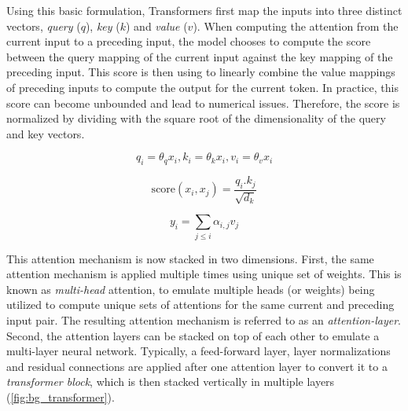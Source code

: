 \documentclass[letterpaper, 12pt]{report}
\begin{document}
Using this basic formulation, Transformers first map the inputs into three distinct vectors, \textit{query} ($q$), \textit{key} ($k$) and \textit{value} ($v$). When computing the attention from the current input to a preceding input, the model chooses to compute the score between the query mapping of the current input against the key mapping of the preceding input. This score is then using to linearly combine the value mappings of preceding inputs to compute the output for the current token. In practice, this score can become unbounded and lead to numerical issues. Therefore, the score is normalized by dividing with the square root of the dimensionality of the query and key vectors.

\begin{equation}
  q_{i} = \theta_{q}x_{i}, k_{i} = \theta_{k}x_{i}, v_{i} = \theta_{v}x_{i}
\end{equation}

\begin{equation}
  \text{score}(x_{i},x_{j}) = \frac{q_{i}.k_{j}}{\sqrt{d_{k}}}
\end{equation}

\begin{equation}
  y_{i} = \sum_{j \le i}\alpha_{i,j}v_{j}
\end{equation}

This attention mechanism is now stacked in two dimensions. First, the same attention mechanism is applied multiple times using unique set of weights. This is known as \textit{multi-head} attention, to emulate multiple heads (or weights) being utilized to compute unique sets of attentions for the same current and preceding input pair. The resulting attention mechanism is referred to as an \textit{attention-layer}.
Second, the attention layers can be stacked on top of each other to emulate a multi-layer neural network. Typically, a feed-forward layer, layer normalizations \citep{ba2016layer} and residual connections are applied after one attention layer to convert it to a \textit{transformer block}, which is then stacked vertically in multiple layers (\autoref{fig:bg_transformer}).
\end{document}
